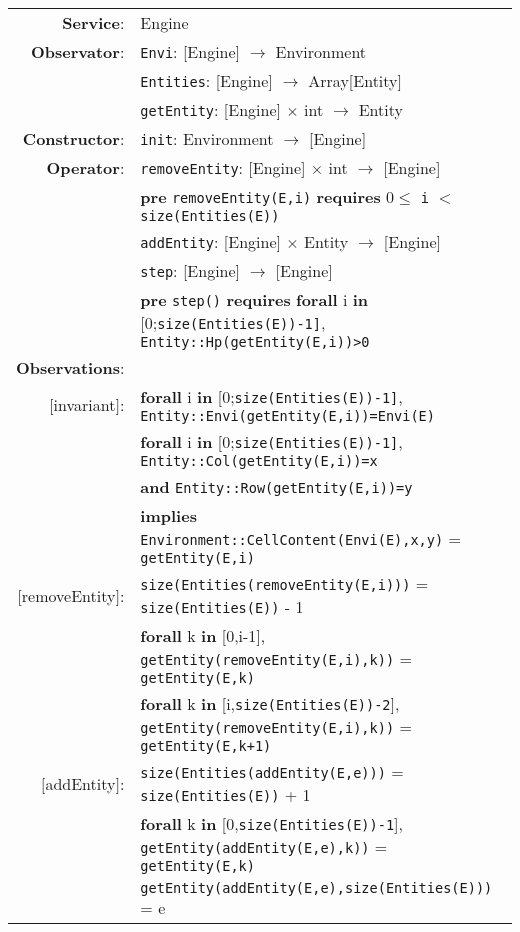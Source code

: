 \documentclass{article}
\begin{document}
\begin{tabular}{rl}
\textbf{Service}: & Engine \\
\textbf{Observator}: & \texttt{Envi}: \textrm{[Engine]} $\rightarrow$ \textrm{Environment} \\
& \texttt{Entities}: \textrm{[Engine]} $\rightarrow$ \textrm{Array[Entity]} \\
& \texttt{getEntity}: \textrm{[Engine]} $\times$ \textrm{int} $\rightarrow$ \textrm{Entity} \\
\textbf{Constructor}: & \texttt{init}: \textrm{Environment} $\rightarrow$ \textrm{[Engine]}\\
\textbf{Operator}: & \texttt{removeEntity}: \textrm{[Engine]} $\times$ \textrm{int} $\rightarrow$ \textrm{[Engine]} \\
& \quad\quad\quad\quad \textbf{pre} \texttt{removeEntity(E,i)} \textbf{requires} $0 \leq$ \texttt{i} $<$ \texttt{size(Entities(E))} \\
& \texttt{addEntity}: \textrm{[Engine]} $\times$ \textrm{Entity} $\rightarrow$ \textrm{[Engine]} \\
& \texttt{step}: \textrm{[Engine]} $\rightarrow$ \textrm{[Engine]}\\
& \quad\quad\quad\quad \textbf{pre} \texttt{step()} \textbf{requires} \textbf{forall} i \textbf{in} [0;\texttt{size(Entities(E))-1]}, \texttt{Entity::Hp(getEntity(E,i))>0} \\
\textbf{Observations}: & \\
$[$invariant$]$: & \textbf{forall} i \textbf{in} [0;\texttt{size(Entities(E))-1]}, \texttt{Entity::Envi(getEntity(E,i))=Envi(E)} \\
& \textbf{forall} i \textbf{in} [0;\texttt{size(Entities(E))-1]}, \texttt{Entity::Col(getEntity(E,i))=x} \\ & \quad\quad\quad\quad\textbf{and} \texttt{Entity::Row(getEntity(E,i))=y} \\
& \quad\quad\quad\quad \textbf{implies} \texttt{Environment::CellContent(Envi(E),x,y)} = \texttt{getEntity(E,i)}  \\
$[$removeEntity$]$: & \texttt{size(Entities(removeEntity(E,i)))} = \texttt{size(Entities(E))} - 1 \\
& \textbf{forall} k \textbf{in} [0,i-1], \texttt{getEntity(removeEntity(E,i),k))} = \texttt{getEntity(E,k)} \\
& \textbf{forall} k \textbf{in} [i,\texttt{size(Entities(E))-2}], \texttt{getEntity(removeEntity(E,i),k))} = \texttt{getEntity(E,k+1)} \\
$[$addEntity$]$: & \texttt{size(Entities(addEntity(E,e)))} = \texttt{size(Entities(E))} + 1 \\
& \textbf{forall} k \textbf{in} [0,\texttt{size(Entities(E))-1}], \texttt{getEntity(addEntity(E,e),k))} = \texttt{getEntity(E,k)} \\
& \texttt{getEntity(addEntity(E,e),size(Entities(E)))} = e
\end{tabular}
\end{document}
